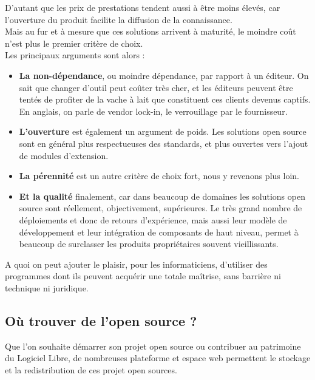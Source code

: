 			D'autant que les prix de prestations tendent aussi à être moins élevés, car l'ouverture du produit facilite la diffusion de la connaissance.\\

			Mais au fur et à mesure que ces solutions arrivent à maturité, le moindre coût n'est plus le premier critère de choix.\\
			Les principaux arguments sont alors :\\


			\begin{itemize}[label=\textbullet, font=\LARGE \color{burntorange}]
				\item \textbf{La non-dépendance}, ou moindre dépendance, par rapport à un éditeur. On sait que changer d'outil peut coûter très cher, et les éditeurs peuvent être tentés de profiter de la vache à lait que constituent ces clients devenus captifs. En anglais, on parle de vendor lock-in, le verrouillage par le fournisseur.
				\item \textbf{L'ouverture} est également un argument de poids. Les solutions open source sont en général plus respectueuses des standards, et plus ouvertes vers l'ajout de modules d'extension.
				\item \textbf{La pérennité} est un autre critère de choix fort, nous y revenons plus loin.
				\item \textbf{Et la qualité} finalement, car dans beaucoup de domaines les solutions open source sont réellement, objectivement, supérieures. Le très grand nombre de déploiements et donc de retours d'expérience, mais aussi leur modèle de développement et leur intégration de composants de haut niveau, permet à beaucoup de surclasser les produits propriétaires souvent vieillissants.
			\end{itemize}

			A quoi on peut ajouter le plaisir, pour les informaticiens, d'utiliser des programmes dont ils peuvent acquérir une totale maîtrise, sans barrière ni technique ni juridique.

		\subsection{Où trouver de l'open source ?} 

		Que l'on souhaite démarrer son projet open source ou contribuer au patrimoine du Logiciel Libre, de nombreuses plateforme et espace web permettent le stockage et la redistribution de ces projet open sources.
		
